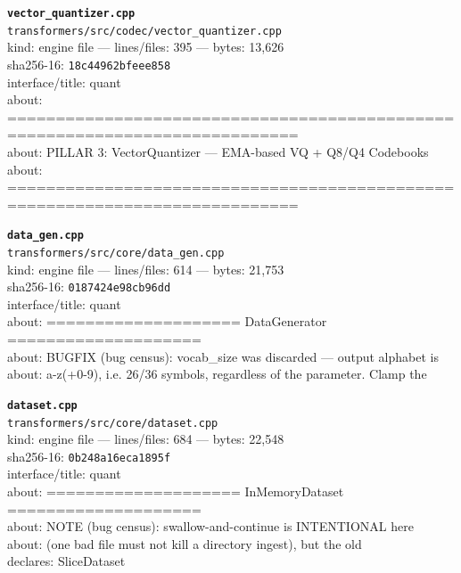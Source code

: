 \noindent\textbf{\texttt{vector\_quantizer.cpp}}\\
\texttt{transformers/src/codec/vector\_quantizer.cpp}\\
kind: engine file --- lines/files: 395 --- bytes: 13,626\\
sha256-16: \texttt{18c44962bfeee858}\\
interface/title: quant\\
about: ============================================================================\\
about: PILLAR 3: VectorQuantizer — EMA-based VQ + Q8/Q4 Codebooks\\
about: ============================================================================\\
\vspace*{6.0pt}

\noindent\textbf{\texttt{data\_gen.cpp}}\\
\texttt{transformers/src/core/data\_gen.cpp}\\
kind: engine file --- lines/files: 614 --- bytes: 21,753\\
sha256-16: \texttt{0187424e98cb96dd}\\
interface/title: quant\\
about: ==================== DataGenerator ====================\\
about: BUGFIX (bug census): vocab\_size was discarded — output alphabet is\\
about: a-z(+0-9), i.e. 26/36 symbols, regardless of the parameter. Clamp the\\
\vspace*{6.0pt}
\newpage

\noindent\textbf{\texttt{dataset.cpp}}\\
\texttt{transformers/src/core/dataset.cpp}\\
kind: engine file --- lines/files: 684 --- bytes: 22,548\\
sha256-16: \texttt{0b248a16eca1895f}\\
interface/title: quant\\
about: ==================== InMemoryDataset ====================\\
about: NOTE (bug census): swallow-and-continue is INTENTIONAL here\\
about: (one bad file must not kill a directory ingest), but the old\\
declares: SliceDataset\\
\vspace*{6.0pt}

